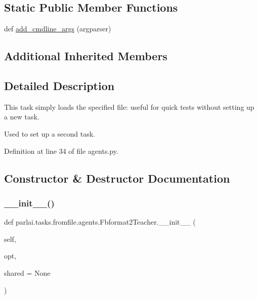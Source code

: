 \subsection*{Static Public Member Functions}
\begin{DoxyCompactItemize}
\item 
def \hyperlink{classparlai_1_1tasks_1_1fromfile_1_1agents_1_1Fbformat2Teacher_a5ddf39912ed941a77cc787a6e2d6db9a}{add\+\_\+cmdline\+\_\+args} (argparser)
\end{DoxyCompactItemize}
\subsection*{Additional Inherited Members}


\subsection{Detailed Description}
\begin{DoxyVerb}This task simply loads the specified file: useful for quick tests without setting up
a new task.

Used to set up a second task.
\end{DoxyVerb}
 

Definition at line 34 of file agents.\+py.



\subsection{Constructor \& Destructor Documentation}
\mbox{\label{classparlai_1_1tasks_1_1fromfile_1_1agents_1_1Fbformat2Teacher_ab1420f53e945bfec70105e1e90f62580}} 
\subsubsection{\texorpdfstring{\+\_\+\+\_\+init\+\_\+\+\_\+()}{\_\_init\_\_()}}
{\footnotesize\ttfamily def parlai.\+tasks.\+fromfile.\+agents.\+Fbformat2\+Teacher.\+\_\+\+\_\+init\+\_\+\+\_\+ (\begin{DoxyParamCaption}\item[{}]{self,  }\item[{}]{opt,  }\item[{}]{shared = {\ttfamily None} }\end{DoxyParamCaption})}



